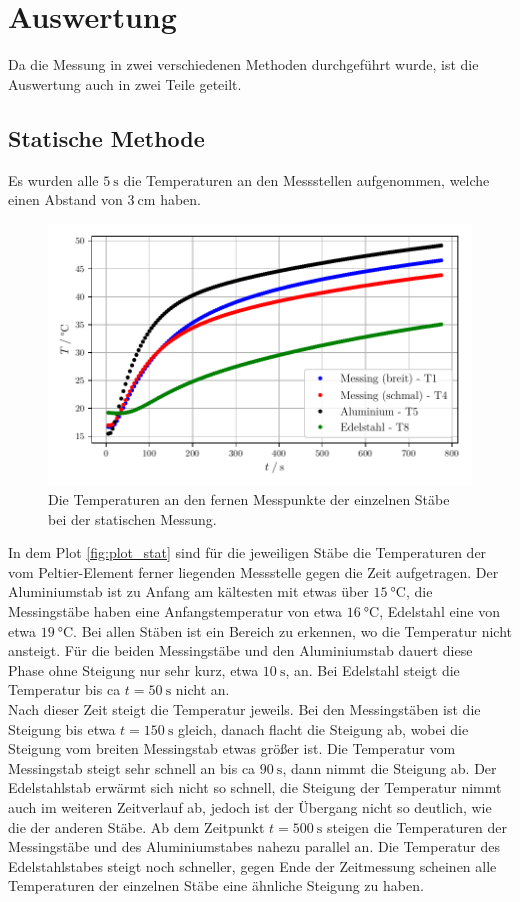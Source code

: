 \section{Auswertung}
\label{sec:Auswertung}
Da die Messung in zwei verschiedenen Methoden durchgeführt wurde, ist die Auswertung auch in zwei Teile geteilt.
\subsection{Statische Methode}
Es wurden alle $\SI{5}{\second}$ die Temperaturen an den Messstellen aufgenommen, welche einen Abstand von $\SI{3}{\centi\metre}$ haben.

\begin{figure}
  \centering
  \includegraphics{build/stat_plot.pdf}
  \caption{Die Temperaturen an den fernen Messpunkte der einzelnen Stäbe bei der statischen Messung. }
  \label{fig:plot_stat}
\end{figure}
In dem Plot \autoref{fig:plot_stat} sind für die jeweiligen Stäbe die Temperaturen der vom Peltier-Element ferner liegenden Messstelle gegen die Zeit aufgetragen.
Der Aluminiumstab ist zu Anfang am kältesten mit etwas über $\SI{15}{\celsius}$, die Messingstäbe haben eine Anfangstemperatur von etwa $\SI{16}{\celsius}$, Edelstahl eine von etwa $\SI{19}{\celsius}$.
Bei allen Stäben ist ein Bereich zu erkennen, wo die Temperatur nicht ansteigt.
Für die beiden Messingstäbe und den Aluminiumstab dauert diese Phase ohne Steigung nur sehr kurz, etwa $\SI{10}{\second}$, an.
Bei Edelstahl steigt die Temperatur bis ca $t = \SI{50}{\second}$ nicht an. \\
Nach dieser Zeit steigt die Temperatur jeweils. 
Bei den Messingstäben ist die Steigung bis etwa $t=\SI{150}{\second}$ gleich, danach flacht die Steigung ab, wobei die Steigung vom breiten Messingstab etwas größer ist.
Die Temperatur vom Messingstab steigt sehr schnell an bis ca $\SI{90}{\second}$, dann nimmt die Steigung ab.
Der Edelstahlstab erwärmt sich nicht so schnell, die Steigung der Temperatur nimmt auch im weiteren Zeitverlauf ab, jedoch ist der Übergang nicht so deutlich, wie die der anderen Stäbe.
Ab dem Zeitpunkt $t=\SI{500}{\second}$ steigen die Temperaturen der Messingstäbe und des Aluminiumstabes nahezu parallel an.
Die Temperatur des Edelstahlstabes steigt noch schneller, gegen Ende der Zeitmessung scheinen alle Temperaturen der einzelnen Stäbe eine ähnliche Steigung zu haben.

